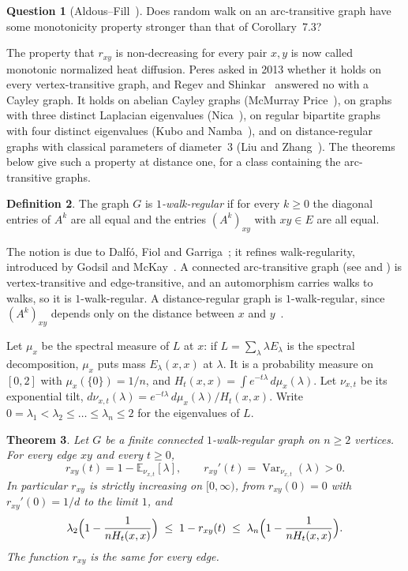 \documentclass[11pt]{amsart}
\newtheorem{theorem}{Theorem}[section]
\theoremstyle{definition}
\newtheorem{definition}[theorem]{Definition}
\newtheorem{question}[theorem]{Question}
\theoremstyle{remark}
\DeclareMathOperator{\Var}{Var}
\newcommand{\E}{\mathbb{E}}
\begin{document}
\begin{question}[{Aldous--Fill~\cite[Open Problem~7.30, p.~262]{AF}}]\label{q:AF}
Does random walk on an arc-transitive graph have some monotonicity property stronger than that of Corollary~7.3?
\end{question}

The property that $r_{xy}$ is non-decreasing for every pair $x,y$ is now called monotonic normalized heat diffusion. Peres asked in 2013 whether it holds on every vertex-transitive graph, and Regev and Shinkar~\cite{RS} answered no with a Cayley graph. It holds on abelian Cayley graphs (McMurray Price~\cite{Pr}), on graphs with three distinct Laplacian eigenvalues (Nica~\cite{Ni}), on regular bipartite graphs with four distinct eigenvalues (Kubo and Namba~\cite{KN}), and on distance-regular graphs with classical parameters of diameter~$3$ (Liu and Zhang~\cite{LZ}). The theorems below give such a property at distance one, for a class containing the arc-transitive graphs.

\begin{definition}
The graph $G$ is \emph{$1$-walk-regular} if for every $k\ge0$ the diagonal entries of $A^k$ are all equal and the entries $(A^k)_{xy}$ with $xy\in E$ are all equal.
\end{definition}

The notion is due to Dalf\'o, Fiol and Garriga~\cite{DFG}; it refines walk-regularity, introduced by Godsil and McKay~\cite{GM}. A connected arc-transitive graph (see \cite[Ch.~17]{Bi} and \cite[Ch.~4]{GR}) is vertex-transitive and edge-transitive, and an automorphism carries walks to walks, so it is $1$-walk-regular. A distance-regular graph is $1$-walk-regular, since $(A^k)_{xy}$ depends only on the distance between $x$ and $y$~\cite[Chapter~4]{BCN}.

Let $\mu_x$ be the spectral measure of $L$ at $x$: if $L=\sum_\lambda \lambda E_\lambda$ is the spectral decomposition, $\mu_x$ puts mass $E_\lambda(x,x)$ at $\lambda$. It is a probability measure on $[0,2]$ with $\mu_x(\{0\})=1/n$, and $H_t(x,x)=\int e^{-t\lambda}\,d\mu_x(\lambda)$. Let $\nu_{x,t}$ be its exponential tilt, $d\nu_{x,t}(\lambda)=e^{-t\lambda}\,d\mu_x(\lambda)/H_t(x,x)$. Write $0=\lambda_1<\lambda_2\le\dots\le\lambda_n\le2$ for the eigenvalues of $L$.

\begin{theorem}\label{thm:main}
Let $G$ be a finite connected $1$-walk-regular graph on $n\ge2$ vertices. For every edge $xy$ and every $t\ge0$,
\begin{equation}\label{eq:mean}
r_{xy}(t)=1-\E_{\nu_{x,t}}[\lambda],\qquad r_{xy}'(t)=\Var_{\nu_{x,t}}(\lambda)>0 .
\end{equation}
In particular $r_{xy}$ is strictly increasing on $[0,\infty)$, from $r_{xy}(0)=0$ with $r_{xy}'(0)=1/d$ to the limit $1$, and
\begin{equation}\label{eq:bounds}
\lambda_2\Bigl(1-\frac{1}{nH_t(x,x)}\Bigr)\;\le\;1-r_{xy}(t)\;\le\;\lambda_n\Bigl(1-\frac{1}{nH_t(x,x)}\Bigr).
\end{equation}
The function $r_{xy}$ is the same for every edge.
\end{theorem}
\end{document}

